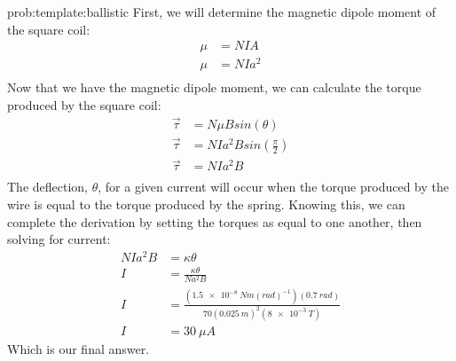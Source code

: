 \begin{solution}{prob:template:ballistic}\label{soln:template:ballistic}
	First, we will determine the magnetic dipole moment of the square coil:
	\begin{align*}
	\mu &= NIA\\
	\mu &=NIa^2\\
	\end{align*}
	Now that we have the magnetic dipole moment, we can calculate the torque produced by the square coil:
	\begin{align*}
	\vec \tau &= N\mu B sin(\theta)\\
	\vec \tau &= NIa^2B sin(\frac{\pi}{2})\\
	\vec \tau &= NIa^2B\\
	\end{align*}
	The deflection, $\theta$, for a given current will occur when the torque produced by the wire is equal to the torque produced by the spring. Knowing this, we can complete the derivation by setting the torques as equal to one another, then solving for current:
	\begin{align*}
	NIa^2B &= \kappa \theta\\
	I &= \frac{\kappa \theta}{Na^2B}\\
	I &= \frac{(\SI{1.5e-8}{Nm(rad)^{-1}}) (\SI{0.7}{rad})}{70(\SI{0.025}{m})^2(\SI{8e-3}{T})}\\
	I &= \SI{30}{\mu A}
	\end{align*}
	Which is our final answer.
\end{solution}

